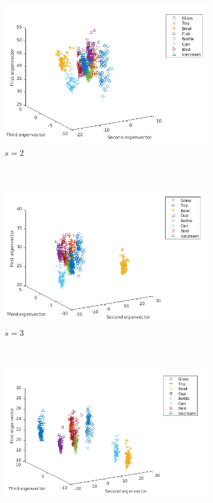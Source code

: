\documentclass[10pt,a4paper]{article}
\begin{document}
\begin{figure}[H]
	\centering
	\begin{subfigure}[b]{0.5\textwidth}
		\includegraphics[width= \textwidth]{images/Mellin-s2.png}
		\caption{$s=2$}
		\label{}
	\end{subfigure}~
	\begin{subfigure}[b]{0.5\textwidth}
		\includegraphics[width= \textwidth]{images/Mellin-s3.png}
		\caption{$s=3$}
		\label{}
	\end{subfigure}\\
	\begin{subfigure}[b]{0.5\textwidth}
		\includegraphics[width= \textwidth]{images/Mellin-s5.png}

\end{subfigure}
\end{figure}
\end{document}

